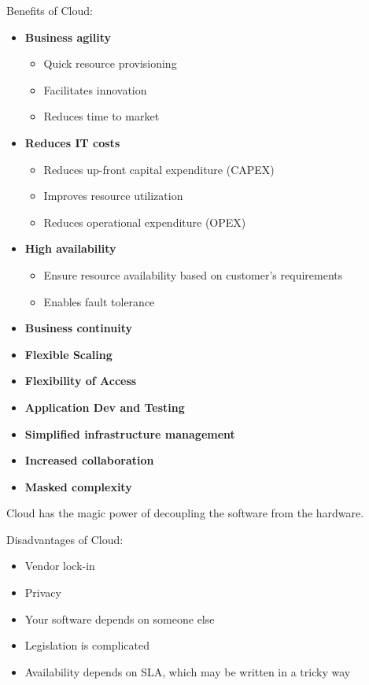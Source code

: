 Benefits of Cloud:
\begin{itemize}
   \item \textbf{Business agility}
   \begin{itemize}
      \item Quick resource provisioning
      \item Facilitates innovation
      \item Reduces time to market
   \end{itemize}
   \item \textbf{Reduces IT costs}
   \begin{itemize}
      \item Reduces up-front capital expenditure (CAPEX)
      \item Improves resource utilization
      \item Reduces operational expenditure (OPEX)
   \end{itemize}
   \item \textbf{High availability}
   \begin{itemize}
      \item Ensure resource availability based on customer's requirements
      \item Enables fault tolerance
   \end{itemize}
   \item \textbf{Business continuity}
   \item \textbf{Flexible Scaling}
   \item \textbf{Flexibility of Access}
   \item \textbf{Application Dev and Testing}
   \item \textbf{Simplified infrastructure management}
   \item \textbf{Increased collaboration}
   \item \textbf{Masked complexity}
\end{itemize}
Cloud has the magic power of decoupling the software from the hardware.

Disadvantages of Cloud:
\begin{itemize}
   \item Vendor lock-in
   \item Privacy
   \item Your software depends on someone else
   \item Legislation is complicated
   \item Availability depends on SLA, which may be written in a tricky way
\end{itemize}

